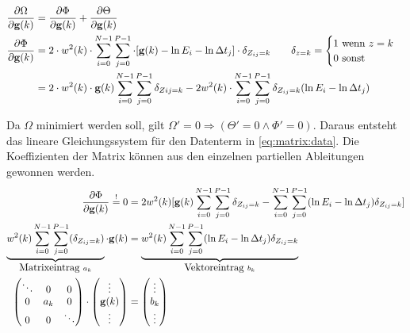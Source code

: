 \begin{align}
\label{eq:energy:partial}
\frac{\partial \Omega}{\partial \mathbf g(k)} 
	& = \frac{\partial \Phi}{\partial \mathbf g(k)} +\frac{\partial \Theta}{\partial \mathbf g(k)}\\
\frac{\partial \Phi}{\partial \mathbf g(k)} 
	&= 2\cdot w^2(k) \cdot \sum \limits_{i=0}^{N-1} \sum \limits_{j=0}^{P-1} \cdot[\mathbf g(k) - \ln E_i - \ln \Delta t_j]\cdot \delta_{Z_{ij}=k} \qquad \delta_{z=k} = \begin{cases}
    1 \mbox{ wenn } z = k\\
    0 \mbox{ sonst}
\end{cases}\\
&=2\cdot w^2(k) \cdot \mathbf g(k) \sum \limits_{i=0}^{N-1} \sum \limits_{j=0}^{P-1}\delta_{Z{ij}=k} - 2w^2(k)\cdot\sum \limits_{i=0}^{N-1} \sum \limits_{j=0}^{P-1}\delta_{Z_{ij}=k}(\ln E_i - \ln \Delta t_j)
\end{align}

Da $\Omega$ minimiert werden soll, gilt $\Omega' = 0 \Rightarrow (\Theta' = 0 \wedge \Phi' = 0)$. Daraus entsteht das lineare Gleichungssystem für den Datenterm in \autoref{eq:matrix:data}. Die Koeffizienten der Matrix können aus den einzelnen partiellen Ableitungen gewonnen werden.
\begin{align}
\frac{\partial \Phi}{\partial \mathbf g(k)} 
    \overset{!}{=} 0 & = 
    2 w^2(k) [\mathbf g(k) \sum_{i=0}^{N-1} \sum_{j=0}^{P-1}\delta_{Z_{ij}=k} - 
    \sum_{i=0}^{N-1} \sum_{j=0}^{P-1}(\ln E_i - \ln \Delta t_j)\delta_{Z_{ij}=k}]\\
    \underbrace{
        w^2(k) \sum_{i=0}^{N-1} \sum_{j=0}^{P-1}(\delta_{Z_{ij}=k})
    }_{\mbox{Matrixeintrag }a_k} 
    \cdot \mathbf g(k) &= 
    \underbrace{
        w^2(k) \sum_{i=0}^{N-1} \sum_{j=0}^{P-1}(\ln E_i - \ln \Delta t_j)\delta_{Z_{ij}=k}
    }_{\mbox{Vektoreintrag }b_k} \\ 
\begin{pmatrix}
\ddots & 0& 0\\
0 & a_k & 0\\
0 & 0 & \ddots
\end{pmatrix}
 \cdot \begin{pmatrix}
 \vdots\\
 \mathbf g(k)\\
 \vdots
 \end{pmatrix} &= \label{eq:matrix:data}
\begin{pmatrix}
 \vdots\\
 b_k\\
 \vdots
 \end{pmatrix} 
\end{align}


